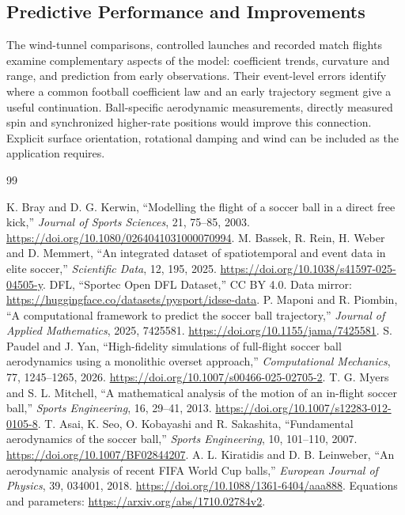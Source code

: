 \documentclass[12pt,letterpaper]{article}
\begin{document}
\subsection{Predictive Performance and Improvements}
The wind-tunnel comparisons, controlled launches and recorded match flights examine complementary aspects of the model: coefficient trends, curvature and range, and prediction from early observations. Their event-level errors identify where a common football coefficient law and an early trajectory segment give a useful continuation. Ball-specific aerodynamic measurements, directly measured spin and synchronized higher-rate positions would improve this connection. Explicit surface orientation, rotational damping and wind can be included as the application requires.
\begin{thebibliography}{99}
\raggedright
{} K. Bray and D. G. Kerwin, ``Modelling the flight of a soccer ball in a direct free kick,'' \emph{Journal of Sports Sciences}, 21, 75--85, 2003. \url{https://doi.org/10.1080/0264041031000070994}.
 M. Bassek, R. Rein, H. Weber and D. Memmert, ``An integrated dataset of spatiotemporal and event data in elite soccer,'' \emph{Scientific Data}, 12, 195, 2025. \url{https://doi.org/10.1038/s41597-025-04505-y}.
 DFL, ``Sportec Open DFL Dataset,'' CC BY 4.0. Data mirror: \url{https://huggingface.co/datasets/pysport/idsse-data}.
 P. Maponi and R. Piombin, ``A computational framework to predict the soccer ball trajectory,'' \emph{Journal of Applied Mathematics}, 2025, 7425581. \url{https://doi.org/10.1155/jama/7425581}.
 S. Paudel and J. Yan, ``High-fidelity simulations of full-flight soccer ball aerodynamics using a monolithic overset approach,'' \emph{Computational Mechanics}, 77, 1245--1265, 2026. \url{https://doi.org/10.1007/s00466-025-02705-2}.
 T. G. Myers and S. L. Mitchell, ``A mathematical analysis of the motion of an in-flight soccer ball,'' \emph{Sports Engineering}, 16, 29--41, 2013. \url{https://doi.org/10.1007/s12283-012-0105-8}.
 T. Asai, K. Seo, O. Kobayashi and R. Sakashita, ``Fundamental aerodynamics of the soccer ball,'' \emph{Sports Engineering}, 10, 101--110, 2007. \url{https://doi.org/10.1007/BF02844207}.
 A. L. Kiratidis and D. B. Leinweber, ``An aerodynamic analysis of recent FIFA World Cup balls,'' \emph{European Journal of Physics}, 39, 034001, 2018. \url{https://doi.org/10.1088/1361-6404/aaa888}. Equations and parameters: \url{https://arxiv.org/abs/1710.02784v2}.

\end{thebibliography}
\end{document}
